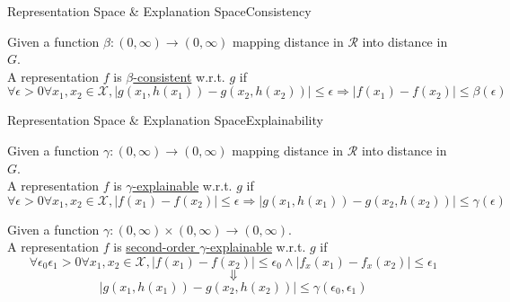 \documentclass[10pt, aspectratio=169]{beamer}
\begin{document}
	\begin{frame}[t]{Representation Space \& Explanation Space}{Consistency}
		\begin{definition}
			Given a function $\beta: (0, \infty)\to (0, \infty)$ mapping distance in $\mathcal{R}$ into distance in $G$.\\
			A representation $f$ is \underline{$\beta$-consistent} w.r.t. $g$ if
			$$
			\forall\epsilon>0\forall x_1, x_2 \in \mathcal{X}, \left|g(x_1, h(x_1)) - g(x_2,h(x_2))\right|\leqslant\epsilon \Rightarrow \left|f(x_1) - f(x_2)\right|\leqslant \beta(\epsilon)
			$$
		\end{definition}
	\end{frame}
	\begin{frame}[t]{Representation Space \& Explanation Space}{Explainability}
		\begin{definition}
			Given a function $\gamma: (0, \infty)\to (0, \infty)$ mapping distance in $\mathcal{R}$ into distance in $G$.\\
			A representation $f$ is \underline{$\gamma$-explainable} w.r.t. $g$ if
			$$
			\forall\epsilon>0\forall x_1, x_2 \in \mathcal{X}, \left|f(x_1) - f(x_2)\right|\leqslant\epsilon \Rightarrow  \left|g(x_1, h(x_1)) - g(x_2,h(x_2))\right|\leqslant\gamma(\epsilon)
			$$
		\end{definition}
		
		\pause\begin{definition}
			Given a function $\gamma: (0, \infty)\times(0, \infty)\to (0, \infty)$.\\
			A representation $f$ is \underline{second-order $\gamma$-explainable} w.r.t. $g$ if
			$$
			\forall\epsilon_0\epsilon_1>0\forall x_1, x_2 \in \mathcal{X},
			\left|f(x_1) - f(x_2)\right|\leqslant\epsilon_0
			\wedge
			\left|f_x(x_1) - f_x(x_2)\right|\leqslant\epsilon_1$$
			$$
			\Downarrow
			$$
			$$
			\left|g(x_1, h(x_1)) - g(x_2,h(x_2))\right|\leqslant\gamma(\epsilon_0,\epsilon_1)
			$$
		\end{definition}
	\end{frame}
\end{document}
